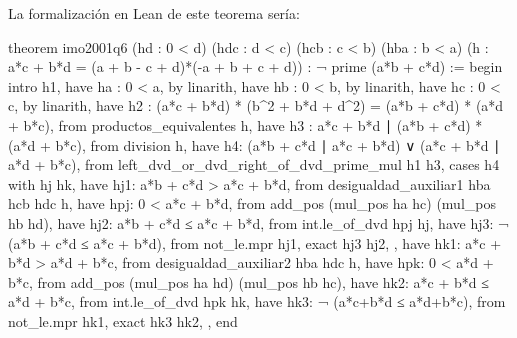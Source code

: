 La formalización en Lean de este teorema sería:
\begin{leancode}
theorem imo2001q6
  (hd  : 0 < d)
  (hdc : d < c)
  (hcb : c < b)
  (hba : b < a)
  (h : a*c + b*d = (a + b - c + d)*(-a + b + c + d))
  : ¬ prime (a*b + c*d) :=
begin
  intro h1,
  have ha : 0 < a,
    by linarith,
  have hb : 0 < b,
    by linarith,
  have hc : 0 < c,
    by linarith,
  have h2 : (a*c + b*d) * (b^2 + b*d + d^2) =
            (a*b + c*d) * (a*d + b*c),
    from productos_equivalentes h,
  have h3 : a*c + b*d ∣ (a*b + c*d) * (a*d + b*c),
    from division h,
  have h4: (a*b + c*d ∣ a*c + b*d) ∨ (a*c + b*d  ∣ a*d + b*c),
    from left_dvd_or_dvd_right_of_dvd_prime_mul h1 h3,
  cases h4 with hj hk,
  { have hj1: a*b + c*d > a*c + b*d,
      from desigualdad_auxiliar1 hba hcb hdc h,
    have hpj: 0 < a*c + b*d,
      from add_pos (mul_pos ha hc) (mul_pos hb hd),
    have hj2: a*b + c*d ≤ a*c + b*d,
      from int.le_of_dvd hpj hj,
    have hj3: ¬ (a*b + c*d ≤ a*c + b*d),
      from not_le.mpr hj1,
    exact hj3 hj2, },
  { have hk1: a*c + b*d > a*d + b*c,
      from desigualdad_auxiliar2 hba hdc h,
    have hpk: 0 < a*d + b*c,
      from add_pos (mul_pos ha hd) (mul_pos hb hc),
    have hk2: a*c + b*d ≤ a*d + b*c,
      from int.le_of_dvd hpk hk,
    have hk3: ¬ (a*c+b*d ≤  a*d+b*c),
      from not_le.mpr hk1,
    exact hk3 hk2, },
end
\end{leancode}

